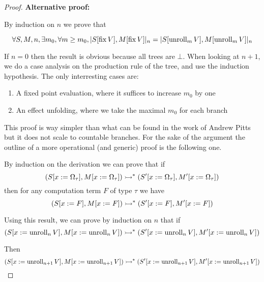 \begin{proof}
    \textbf{Alternative proof:}

    By induction on $n$ we prove that 

    \begin{equation*}
        \forall S,M,n,
        \exists m_0, \forall m \geq m_0, 
        |S[\operatorname{fix} V], M[\operatorname{fix} V]|_n = |S[\operatorname{unroll}_m V], M[\operatorname{unroll}_m V]|_n
    \end{equation*}


    If $n = 0$ then the result is obvious because all trees are $\bot$.
    When looking at $n+1$, we do a case analysis on the production rule 
    of the tree, and use the induction hypothesis. The only interresting 
    cases are: 

    \begin{enumerate}
        \item A fixed point evaluation, where it suffices to increase $m_0$ 
            by one
        \item An effect unfolding, where we take the maximal $m_0$ for each
            branch
    \end{enumerate}

    This proof is way simpler than what can be found in the work of Andrew Pitts
    but it does not scale to countable branches. For the sake of the argument 
    the outline of a more operational (and generic) proof is the following one.

    By induction on the derivation we can prove that 
    if 
    \begin{equation*}
        (S[x:=\Omega_\tau],M[x:=\Omega_\tau]) \rightarrowtail^* 
        (S'[x:=\Omega_\tau], M'[x:=\Omega_\tau])
    \end{equation*}
    then for any computation term $F$ of type $\tau$ 
    we have 
    \begin{equation*}
        (S[x:=F],M[x:=F]) \rightarrowtail^* 
        (S'[x:=F], M'[x:=F])
    \end{equation*}

    Using this result, we can prove by induction on $n$ 
    that if 
    \begin{equation*}
        (S[x:=\operatorname{unroll}_n V],M[x:=\operatorname{unroll}_n V]) \rightarrowtail^* 
        (S'[x:=\operatorname{unroll}_n V], M'[x:=\operatorname{unroll}_n V])
    \end{equation*}

    Then 
    \begin{equation*}
        (S[x:=\operatorname{unroll}_{n+1} V],M[x:=\operatorname{unroll}_{n+1} V]) \rightarrowtail^* 
        (S'[x:=\operatorname{unroll}_{n+1} V], M'[x:=\operatorname{unroll}_{n+1} V])
    \end{equation*}


\end{proof}
